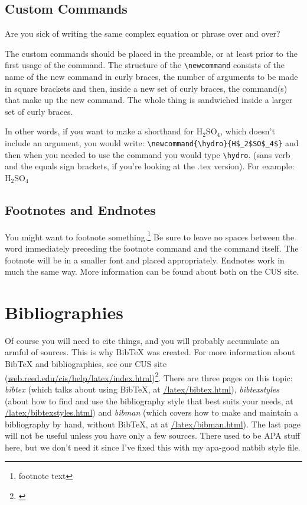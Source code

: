 \documentclass[12pt,twoside]{reedthesis}
\begin{document}
	\subsection{Custom Commands}\label{commands}
	Are you sick of writing the same complex equation or phrase over and over? 
	
	The custom commands should be placed in the preamble, or at least prior to the first usage of the command. The structure of the \verb=\newcommand= consists of the name of the new command in curly braces, the number of arguments to be made in square brackets and then, inside a new set of curly braces, the command(s) that make up the new command. The whole thing is sandwiched inside a larger set of curly braces. 
	
	\newcommand{\hydro}{H$_2$SO$_4$}
	
	In other words, if you want to make a shorthand for H$_2$SO$_4$, which doesn't include an argument, you would write: \verb=\newcommand{\hydro}{H$_2$SO$_4$}= and then when you needed  to use the command you would type \verb=\hydro=. (sans verb and the equals sign brackets, if you're looking at the .tex version). For example: \hydro

	\subsection{Footnotes and Endnotes}
		You might want to footnote something.\footnote{footnote text} Be sure to leave no spaces between the word immediately preceding the footnote command and the command itself. The footnote will be in a smaller font and placed appropriately. Endnotes work in much the same way. More information can be found about both on the CUS site.
		
	\section{Bibliographies}
		Of course you will need to cite things, and you will probably accumulate an armful of sources. This is why BibTeX was created. For more information about BibTeX and bibliographies, see our CUS site (\url{web.reed.edu/cis/help/latex/index.html})\footnote{\cite{reedweb:2007}}. There are three pages on this topic: {\it bibtex} (which talks about using BibTeX, at \url{/latex/bibtex.html}), {\it bibtexstyles} (about how to find and use the bibliography style that best suits your needs, at \url{/latex/bibtexstyles.html}) and {\it bibman} (which covers how to make and maintain a bibliography by hand, without BibTeX, at at \url{/latex/bibman.html}). The last page will not be useful unless you have only a few sources. There used to be APA stuff here, but we don't need it since I've fixed this with my apa-good natbib style file.
		
\end{document}
